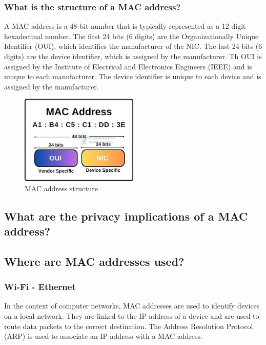 \documentclass[aps,prb,twocolumn,superscriptaddress,floatfix,longbibliography,nofootinbib]{revtex4-2}
\begin{document}
    \subsubsection{\label{sec:Structure}What is the structure of a MAC address?}
    A MAC address is a 48-bit number that is typically represented as a 12-digit hexadecimal number.
    The first 24 bits (6 digits) are the Organizationally Unique Identifier (OUI), 
    which identifies the manufacturer of the NIC.
    The last 24 bits (6 digits) are the device identifier, which is assigned by the manufacturer.
    Th OUI is assigned by the Institute of Electrical and Electronics Engineers (IEEE)
    and is unique to each manufacturer.
    The device identifier is unique to each device and is assigned by the manufacturer.
  \begin{figure}[H]
      \centering
      \includegraphics[width=0.5\textwidth]{pictures/mac.jpeg}
      \caption{MAC address structure \cite{MAC}}
      \label{fig:MAC}
  \end{figure}

  \subsection{\label{sec:Privacy}What are the privacy implications of a MAC address?}
  \subsection{\label{sec:Where}Where are MAC addresses used?}
    \subsubsection{\label{subsec:Wi-Fi}Wi-Fi - Ethernet}
  In the context of computer networks, MAC addresses are used to identify devices on a local network.
  They are linked to the IP address of a device and are used to route data packets to the correct destination.
  The Address Resolution Protocol (ARP) is used to associate an IP address with a MAC address.
\end{document}
